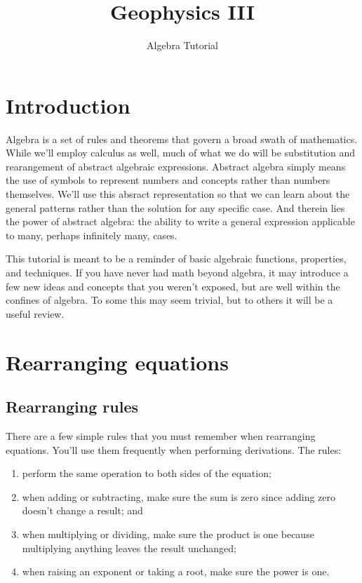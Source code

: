 \documentclass[final,a4paper,12pt]{article}
\title{Geophysics III}
\author{Algebra Tutorial}
\date{}
\theoremstyle{definition}
\begin{document}
\maketitle

\section{Introduction}
Algebra is a set of rules and theorems that govern a broad swath of mathematics.
While we'll employ calculus as well, much of what we do will be
substitution and rearangement of abstract algebraic expressions.  Abstract
algebra simply means the use of symbols to represent numbers and concepts rather
than numbers themselves.  We'll use this absract representation so that we can
learn about the general patterns rather than the solution for any specific case.
And therein lies the power of abstract algebra: the ability to write a general
expression applicable to many, perhaps infinitely many, cases.

This tutorial is meant to be a reminder of basic algebraic functions,
properties, and techniques.  If you have never had math beyond algebra, it may
introduce a few new ideas and concepts that you weren't exposed, but are well
within the confines of algebra.  To some this may seem trivial, but to others it
will be a useful review.


\section{Rearranging equations}
\subsection{Rearranging rules}
There are a few simple rules that you must remember when rearranging equations.
You'll use them frequently when performing derivations.  The rules:
\begin{enumerate}
    \item perform the same operation to both sides of the equation;
    \item when adding or subtracting, make sure the sum is zero since adding
    zero doesn't change a result; and
    \item when multiplying or dividing, make sure the product is one because
    multiplying anything leaves the result unchanged;
    \item when raising an exponent or taking a root, make sure the power is
    one.
\end{enumerate}
\end{document}
